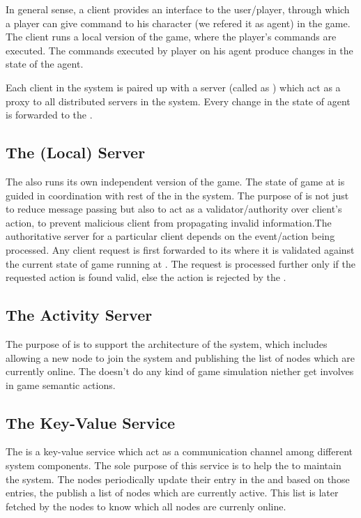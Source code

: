	In general sense, a client provides an interface to the user/player, through which a player can give command to his character (we refered it as agent) in the game. The client runs a local version of the game, where the player's commands are executed. The commands executed by player on his agent produce changes in the state of the agent. 
	
	Each client in the system is paired up with a server (called as \localServer) which act as a proxy to all distributed servers in the system. Every change in the state of agent is forwarded to the \localServer. 
	
\subsection{The (Local) Server}

	The \localServer also runs its own independent version of the game. The state of game at \localServer is guided in coordination with rest of the \localServers in the system. The purpose of \localServer is not just to reduce message passing but also to act as a validator/authority over client's action, to prevent malicious client from propagating invalid information.The authoritative server for a particular client depends on the event/action being processed. Any client request is first forwarded to its \localServer where it is validated against the current state of game running at \localServer. The request is processed further only if the requested action is found valid, else the action is rejected by the \localServer. 
	
\subsection{The Activity Server}
	The purpose of \activityServer is to support the architecture of the system, which includes allowing a new node to join the system and publishing the list of nodes which are currently online. The \activityServer doesn't do any kind of game simulation niether get involves in game semantic actions.

\subsection{The Key-Value Service}
	The \kvService is a key-value service which act as a communication channel among different system components. The sole purpose of this service is to help the \activityServer to maintain the system. The nodes periodically update their entry in the \kvService and based on those entries, the \activityServer publish a list of nodes which are currently active. This list is later fetched by the nodes to know which all nodes are currenly online.

